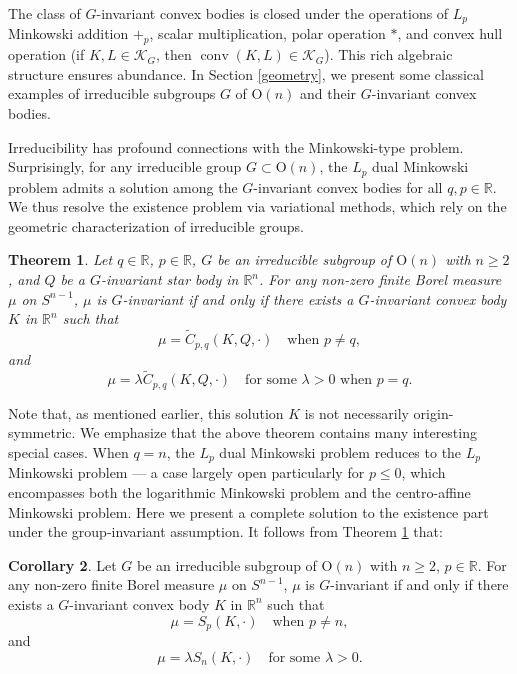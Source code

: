 \documentclass[12pt, reqno]{amsart}
\newtheorem{theorem}{Theorem}[section]
\theoremstyle{definition}
\newtheorem{corollary}[theorem]{Corollary}
\theoremstyle{remark}
\numberwithin{equation}{section}
\newcommand{\R}{\mathbb{R}}
\newcommand{\conv}{\operatorname{conv}}
\newcommand{\On}{\mathrm{O}(n)}
\begin{document}
		
		
		The class of $G$-invariant convex bodies is  closed under the operations of   $L_p$ Minkowski addition $+_{p}$, scalar multiplication, polar  operation $*$, and convex hull operation  (if $K, L\in \mathcal{K}_{G}$, then $\conv(K, L) \in \mathcal{K}_{G}$). This rich algebraic structure ensures abundance. In Section \ref{geometry}, we present some classical examples of irreducible subgroups $G$ of $\On$ and their $G$-invariant convex bodies.

Irreducibility has profound connections with the Minkowski-type problem.  Surprisingly,  for any irreducible group $G\subset\On$, the $L_p$ dual Minkowski problem admits a solution among the $G$-invariant convex bodies for all $q, p \in \mathbb{R}$. We thus  resolve the existence problem via variational methods, which rely on the geometric characterization of irreducible groups.
		

			\begin{theorem}\label{1.2}
			Let $q\in \mathbb{R}$, $p \in \mathbb{R}$, $G$ be an irreducible subgroup of $\mathrm{O}(n)$ with $n \geq 2$, and $Q$ be a $G$-invariant star body in $\mathbb{R}^n$. For any non-zero finite Borel measure $\mu$ on $S^{n-1}$, $\mu$ is $G$-invariant if and only if there exists a $G$-invariant convex body $K$ in $\mathbb{R}^n$ such that
			\[
			\mu = \widetilde{C}_{p,q}(K, Q, \cdot) \quad \text{when  $p \neq q$},
			\]
			and
			\[
			\mu = \lambda \widetilde{C}_{p,q}(K, Q, \cdot) \quad \text{for some $\lambda>0$ when $p=q$}.
			\]
		\end{theorem}


Note that, as mentioned earlier, this solution $K$ is not necessarily origin-symmetric.
We emphasize that the above theorem contains many interesting special  cases.		When $q = n$, the $L_p$ dual Minkowski problem reduces to the $L_p$ Minkowski problem — a case largely open particularly for $p \leq 0$, which encompasses both the logarithmic Minkowski problem and the centro-affine Minkowski problem.   Here we present a complete  solution to the existence part under the group-invariant assumption. It follows from Theorem \ref{1.2} that:

 
\begin{corollary}
		Let  $G$ be an irreducible subgroup of $\mathrm{O}(n)$ with $n \geq 2$, $p\in\R$.  For any non-zero finite Borel measure $\mu$ on $S^{n-1}$, $\mu$ is $G$-invariant if and only if there exists a $G$-invariant convex body $K$ in $\mathbb{R}^n$ such that
	\[
	\mu = S_{p}(K,  \cdot) \quad \text{when  $p \neq n$},
	\]
	and
	\[
	\mu = \lambda S_{n}(K, \cdot) \quad \text{for some $\lambda>0$}.
	\]
\end{corollary}
\end{document}
